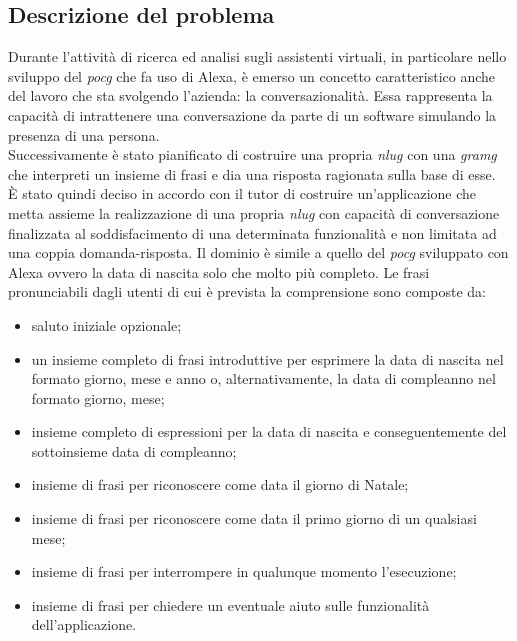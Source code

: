	\subsection{Descrizione del problema}
	Durante l'attività di ricerca ed analisi sugli assistenti virtuali, in particolare nello sviluppo del \emph{\gls{pocg}} che fa uso di Alexa, è emerso un concetto caratteristico anche del lavoro che sta svolgendo l'azienda: la conversazionalità. Essa rappresenta la capacità di intrattenere una conversazione da parte di un software simulando la presenza di una persona. \\
	Successivamente è stato pianificato di costruire una propria \emph{\gls{nlug}} con una \emph{\gls{gramg}} che interpreti un insieme di frasi e dia una risposta ragionata sulla base di esse. \\
	È stato quindi deciso in accordo con il tutor di costruire un'applicazione che metta assieme la realizzazione di una propria \emph{\gls{nlug}} con capacità di conversazione finalizzata al soddisfacimento di una determinata funzionalità e non limitata ad una coppia domanda-risposta. Il dominio è simile a quello del \emph{\gls{pocg}} sviluppato con Alexa ovvero la data di nascita solo che molto più completo. Le frasi pronunciabili dagli utenti di cui è prevista la comprensione sono  composte da:
	\begin{itemize}
		\item saluto iniziale opzionale;
		\item un insieme completo di frasi introduttive per esprimere la data di nascita nel formato giorno, mese e anno o, alternativamente, la data di compleanno nel formato giorno, mese;
		\item insieme completo di espressioni per la data di nascita e conseguentemente del sottoinsieme data di compleanno;
		\item insieme di frasi per riconoscere come data il giorno di Natale;
		\item insieme di frasi per riconoscere come data il primo giorno di un qualsiasi mese;
		\item insieme di frasi per interrompere in qualunque momento l'esecuzione;
		\item insieme di frasi per chiedere un eventuale aiuto sulle funzionalità dell'applicazione.
	\end{itemize}
